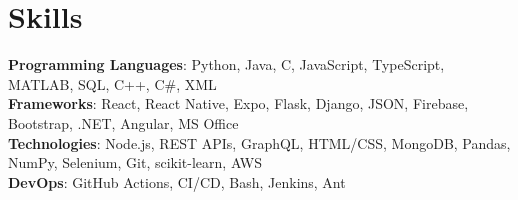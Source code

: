 \section{Skills}
    \begin{itemize}[leftmargin=0.15in, label={}]
	\small{\item{
		\textbf{Programming Languages}{: Python, Java, C, JavaScript, TypeScript, MATLAB, SQL, C++, C\#, XML} \\
		\textbf{Frameworks}{: React, React Native, Expo, Flask, Django, JSON, Firebase, Bootstrap, .NET, Angular, MS Office} \\
		\textbf{Technologies}{: Node.js, REST APIs, GraphQL,  HTML/CSS, MongoDB, Pandas, NumPy, Selenium, Git, scikit-learn, AWS} \\
		\textbf{DevOps}{: GitHub Actions, CI/CD, Bash, Jenkins, Ant} \\
	}}
    \end{itemize}
